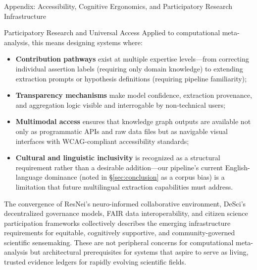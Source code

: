 \documentclass[
  ignorenonframetext,
]{beamer}
\begin{document}
\begin{frame}{Appendix: Accessibility, Cognitive Ergonomics, and
Participatory Research Infrastructure \label{sec:accessibility}}
\begin{block}{Participatory Research and Universal Access}
Applied to computational meta-analysis, this means designing systems
where:

\begin{itemize}
  \item \textbf{Contribution pathways} exist at multiple expertise levels---from correcting individual assertion labels (requiring only domain knowledge) to extending extraction prompts or hypothesis definitions (requiring pipeline familiarity);
  \item \textbf{Transparency mechanisms} make model confidence, extraction provenance, and aggregation logic visible and interrogable by non-technical users;
  \item \textbf{Multimodal access} ensures that knowledge graph outputs are available not only as programmatic APIs and raw data files but as navigable visual interfaces with WCAG-compliant accessibility standards;
  \item \textbf{Cultural and linguistic inclusivity} is recognized as a structural requirement rather than a desirable addition---our pipeline's current English-language dominance (noted in \S\ref{sec:conclusion} as a corpus bias) is a limitation that future multilingual extraction capabilities must address.
\end{itemize}

The convergence of ResNei's neuro-informed collaborative environment,
DeSci's decentralized governance models, FAIR data interoperability, and
citizen science participation frameworks collectively describes the
emerging infrastructure requirements for equitable, cognitively
supportive, and community-governed scientific sensemaking. These are not
peripheral concerns for computational meta-analysis but architectural
prerequisites for systems that aspire to serve as living, trusted
evidence ledgers for rapidly evolving scientific fields.
\end{block}
\end{frame}
\end{document}
